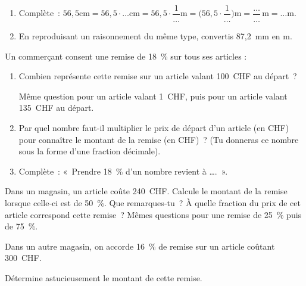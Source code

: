 \begin{activite}
\begin{partie}
\begin{enumerate}
 \item Complète : $56,5 \text{cm} = 56,5 \cdot \ldots \text{cm} = 56,5 \cdot \dfrac{1}{\ldots} \text{m} = \bigg(56,5 \cdot \dfrac{1}{\ldots} \bigg) \text{m} =\dfrac{\ldots}{\ldots} \, \text{m} = \ldots \text{m}$.
 \item En reproduisant un raisonnement du même type, convertis 87,2 mm en m.
 \end{enumerate}
\end{partie}

\end{activite}


\begin{activite}

\begin{partie}
Un commerçant consent une remise de 18 \% sur tous ses articles :
\begin{enumerate}
 \item Combien représente cette remise sur un article valant 100 CHF au départ ?
 
Même question pour un article valant 1 CHF, puis pour un article valant 135 CHF au départ.
 \item Par quel nombre faut-il multiplier le prix de départ d'un article (en CHF) pour connaître le montant de la remise (en CHF) ? (Tu donneras ce nombre sous la forme d'une fraction décimale).
 \item Complète : « Prendre 18 \% d'un nombre revient à \ldots . ».
 \end{enumerate}
\end{partie}

\begin{partie}
Dans un magasin, un article coûte 240 CHF. Calcule le montant de la remise lorsque celle‑ci est de 50 \%. Que remarques‑tu ? À quelle fraction du prix de cet article correspond cette remise ? Mêmes questions pour une remise de 25 \% puis de 75 \%.
\end{partie}

\begin{partie}
Dans un autre magasin, on accorde 16 \% de remise sur un article coûtant 300 CHF.

Détermine astucieusement le montant de cette remise.
\end{partie}

\end{activite}

